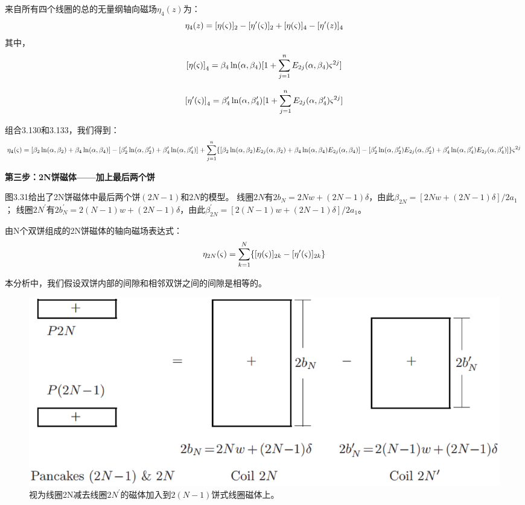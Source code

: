来自所有四个线圈的总的无量纲轴向磁场$\eta_4(z)$为：
$$
\eta_{4}(z)=[\eta(\varsigma)]_{2}-[\eta'(\varsigma)]_{2}+[\eta(\varsigma)]_{4}-[\eta'(z)]_{4}\\%
$$
其中，
$$
{[\eta(\varsigma)]}_{4}=\beta_{4}\ln(\alpha,\beta_{4})[1+\sum_{j=1}^{n}E_{2j}(\alpha,\beta_{4})\varsigma^{2j}]\\%
$$

$$
{[\eta'(\varsigma)]}_{4}=\beta'_{4}\ln(\alpha,\beta'_{4})[1+\sum_{j=1}^{n}E_{2j}(\alpha,\beta'_{4})\varsigma^{2j}]\\%
$$

组合3.130和3.133，我们得到：
$$
\eta_{4}(\varsigma)=[\beta_{2}\ln(\alpha,\beta_{2})+\beta_{4}\ln(\alpha,\beta_{4})]-[\beta'_{2}\ln(\alpha,\beta'_{2})+\beta'_{4}\ln(\alpha,\beta'_{4})]\\
+\sum_{j=1}^{n}\{[\beta_{2}\ln(\alpha,\beta_{2})E_{2j}(\alpha,\beta_{2})+\beta_{4}\ln(\alpha,\beta_{4})E_{2j}(\alpha,\beta_{4})]\\
-[\beta'_{2}\ln(\alpha,\beta'_{2})E_{2j}(\alpha,\beta'_{2})+\beta'_{4}\ln(\alpha,\beta'_{4})E_{2j}(\alpha,\beta'_{4})]\}\varsigma^{2j}\\%
$$

\textbf{第三步：2N饼磁体——加上最后两个饼}

图3.31给出了2N饼磁体中最后两个饼$(2N−1)$和$2N$的模型。
线圈$2N$有$2b_N =2Nw+(2N−1)\delta$，由此$\beta_{2N}=[2Nw+(2N−1)\delta]/2a_1$；
线圈$2N^\prime$有$2b_N^\prime=2(N-1)w+(2N−1)\delta$，由此$\beta_{2N}^\prime=[2(N-1)w+(2N−1)\delta]/2a_1$。

由N个双饼组成的2N饼磁体的轴向磁场表达式：
\begin{equation}
\eta_{2N}(\varsigma)=\sum_{k=1}^{N}\{[\eta(\varsigma)]_{2k}-[\eta'(\varsigma)]_{2k}\}\\%
\end{equation}

本分析中，我们假设双饼内部的间隙和相邻双饼之间的间隙是相等的。
\begin{figure}[htbp]
	\centering
	\includegraphics[scale=0.4]{chpt3/figs/fig3.31.eps}
	\caption{视为线圈2N减去线圈$2N^\prime$的磁体加入到$2(N-1)$饼式线圈磁体上。}
\end{figure}

